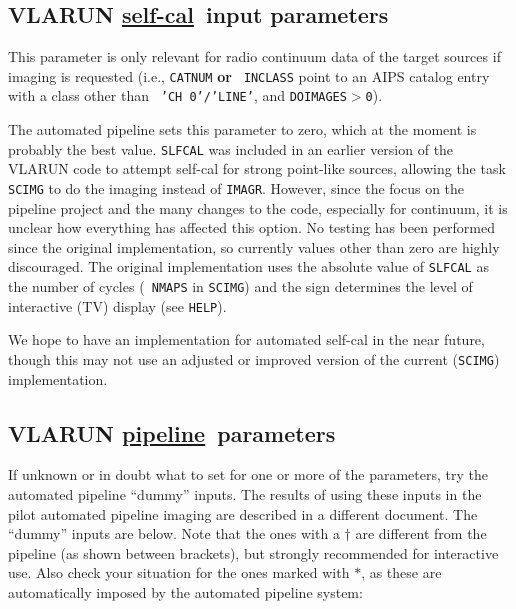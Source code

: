 \subsection{VLARUN \underline{self-cal}\ input parameters}
This parameter is only relevant for radio continuum data of the target
sources if imaging is requested (i.e., {\tt CATNUM} {\bf or} {\tt
INCLASS} point to an AIPS catalog entry with a class other than {\tt
'CH 0'/'LINE'}, and {\tt DOIMAGES$>$0}).

The automated pipeline sets this parameter to zero, which at the
moment is probably the best value. {\tt SLFCAL} was included in an
earlier version of the VLARUN code to attempt self-cal for strong
point-like sources, allowing the task {\tt SCIMG} to do the imaging
instead of {\tt IMAGR}. However, since the focus on the pipeline
project and the many changes to the code, especially for continuum, it
is unclear how everything has affected this option. No testing has
been performed since the original implementation, so currently values
other than zero are highly discouraged. The original implementation
uses the absolute value of {\tt SLFCAL} as the number of cycles ({\tt
NMAPS} in {\tt SCIMG}) and the sign determines the level of
interactive (TV) display (see {\tt HELP}).

We hope to have an implementation for automated self-cal in the near
future, though this may not use an adjusted or improved version of the
current ({\tt SCIMG}) implementation.

\subsection{VLARUN \underline{pipeline}\ parameters}
If unknown or in doubt what to set for one or
more of the parameters, try the automated pipeline ``dummy''
inputs. The results of using these inputs in the pilot automated
pipeline imaging are described in a different document. The ``dummy''
inputs are below. Note that the ones with a $\dagger$ are different
from the pipeline (as shown between brackets), but strongly
recommended for interactive use. Also check your situation for the ones marked with
$\ast$, as these are automatically imposed by the automated pipeline
system:

